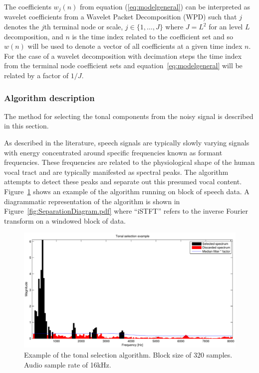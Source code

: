 The coefficients $w_{j}(n)$ from equation (\ref{eq:modelgeneral}) can be interpreted as wavelet coefficients from a Wavelet Packet Decomposition (WPD) such that $j$ denotes the $j$th terminal node or scale, $j \in \{1, \ldots, J\}$ where $J = L^2$ for an level $L$ decomposition, and $n$ is the time index related to the coefficient set and so $w(n)$ will be used to denote a vector of all coefficients at a given time index $n$. For the case of a wavelet decomposition with decimation steps the time index from the terminal node coefficient sets and equation~\ref{eq:modelgeneral} will be related by a factor of $1/J$.

\subsubsection{Algorithm description}\label{sec:WPdetectionSep}
The method for selecting the tonal components from the noisy signal is described in this section.

As described in the literature\cite{Vaseghi1988thesis}\cite{Vaseghi1990}, speech signals are typically slowly varying signals with energy concentrated around specific frequencies known as formant frequencies. These frequencies are related to the physiological shape of the human vocal tract and are typically manifested as spectral peaks\cite{Fant1970}. The algorithm attempts to detect these peaks and separate out this presumed vocal content. Figure~\ref{fig:Separation_Spectrum_Selection.pdf} shows an example of the algorithm running on block of speech data. A diagrammatic representation of the algorithm is shown in Figure~\ref{fig:SeparationDiagram.pdf} where ``iSTFT'' refers to the inverse Fourier transform on a windowed block of data.

\begin{figure} %
\begin{minipage}[b]{1.0\linewidth}
  \centering
  \centerline{\includegraphics[width=14cm]{Separation_Spectrum_Selection.pdf}}
\end{minipage}
\caption{Example of the tonal selection algorithm. Block size of 320 samples. Audio sample rate of 16kHz.}
\label{fig:Separation_Spectrum_Selection.pdf}
\end{figure}

